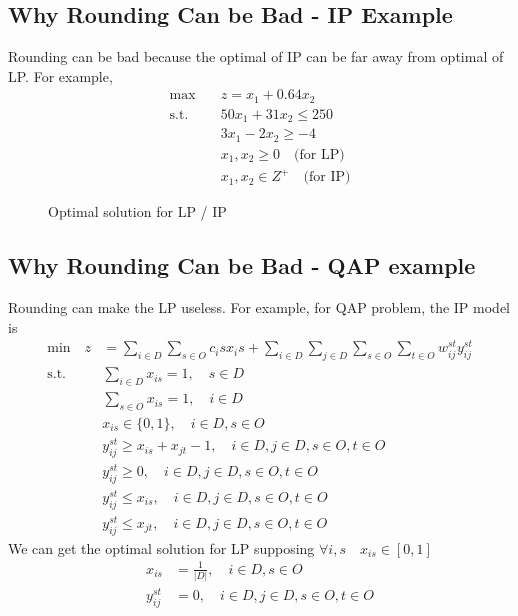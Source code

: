 			\subsection{Why Rounding Can be Bad - IP Example}
				Rounding can be bad because the optimal of IP can be far away from optimal of LP. For example,
				\begin{align}
					\text{max} \quad & z=x_1 +0.64x_2  \\
					\text{s.t.} \quad & 50x_1 +31x_2 \le 250  \\
								& 3x_1-2x_2\ge -4  \\
								& x_1,x_2\ge 0 \quad \text{(for LP)}\\
								& x_1,x_2 \in Z^+ \quad \text{(for IP)} 
				\end{align}
				\begin{figure}[h!]
					\centering
					\caption{Optimal solution for LP / IP}
				\end{figure}

			\subsection{Why Rounding Can be Bad - QAP example}
				Rounding can make the LP useless. For example, for QAP problem, the IP model is
				\begin{align}
					\text{min} \quad z &= \sum_{i\in D} \sum_{s\in O} c_is x_is + \sum_{i\in D} \sum_{j \in D} \sum_{s \in O} \sum_{t\in O} w_{ij}^{st}y_{ij}^{st}  \\
					\text{s.t.} \quad & \sum_{i \in D} x_{is} =1, \quad s\in D  \\
								&\sum_{s \in O} x_{is} = 1, \quad i \in D  \\
								&x_{is} \in \{0, 1\}, \quad i \in D, s\in O  \\
								& y_{ij}^{st} \ge x_{is} + x_{jt} - 1, \quad i\in D, j\in D, s\in O, t \in O  \\
								& y_{ij}^{st} \ge 0, \quad i\in D, j\in D, s\in O, t \in O  \\
								& y_{ij}^{st} \le x_{is}, \quad i\in D, j\in D, s\in O, t \in O  \\
								& y_{ij}^{st} \le x_{jt}, \quad i\in D, j\in D, s\in O, t \in O  
				\end{align}
				We can get the optimal solution for LP supposing $\forall i, s \quad x_{is}\in [0, 1]$
				\begin{align}
					x_{is} &= \frac{1}{|D|}, \quad i \in D, s\in O   \\
					y_{ij}^{st} & = 0, \quad i\in D, j\in D, s\in O, t \in O 
				\end{align}

